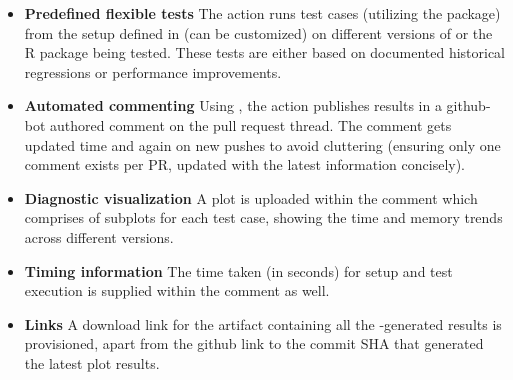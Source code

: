 \begin{itemize}
    \item \textbf{Predefined flexible tests} 
    \newline
    The action runs test cases (utilizing the  package) from the setup defined in  (can be customized) on different versions of  or the R package being tested. These tests are either based on documented historical regressions or performance improvements.
    \item \textbf{Automated commenting}
    \newline
    Using , the action publishes results in a github-bot authored comment on the pull request thread. The comment gets updated time and again on new pushes to avoid cluttering (ensuring only one comment exists per PR, updated with the latest information concisely). 
    \item \textbf{Diagnostic visualization}
    \newline
    A plot is uploaded within the comment which comprises of subplots for each test case, showing the time and memory trends across different  versions.
    \item \textbf{Timing information}
    \newline
    The time taken (in seconds) for setup and test execution is supplied within the comment as well.
    \item \textbf{Links}
    \newline
    A download link for the artifact containing all the -generated results is provisioned, apart from the github link to the commit SHA that generated the latest plot results.


\end{itemize}
